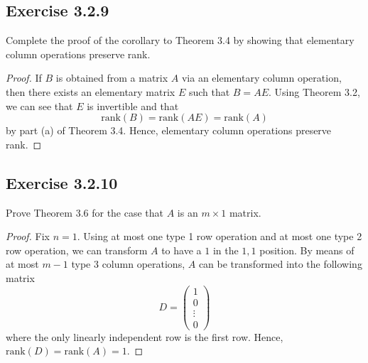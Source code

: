 \subsection*{Exercise 3.2.9} Complete the proof of the corollary to Theorem 3.4 by showing that elementary column operations preserve rank.
\begin{proof}
If \( B  \) is obtained from a matrix \( A  \) via an elementary column operation, then there exists an elementary matrix \( E  \) such that \( B = AE  \). Using Theorem 3.2, we can see that \( E  \) is invertible and that 
\[  \text{rank}(B) = \text{rank}(AE) = \text{rank}(A) \] by part (a) of Theorem 3.4.
Hence, elementary column operations preserve rank.
\end{proof}

\subsection*{Exercise 3.2.10} Prove Theorem 3.6 for the case that \( A  \) is an \( m \times 1  \) matrix.
\begin{proof}
Fix \( n = 1  \). Using at most one type 1 row operation and at most one type 2 row operation, we can transform \( A  \) to have a \( 1  \) in the \( 1,1 \) position. By means of at most \( m - 1  \) type 3 column operations, \( A  \) can be transformed into the following matrix
\[  D = \begin{pmatrix} 
           1 \\
           0 \\
           \vdots \\
           0 
          \end{pmatrix} \] where the only linearly independent row is the first row. Hence, \( \text{rank}(D) = \text{rank}(A) = 1  \).
\end{proof}

